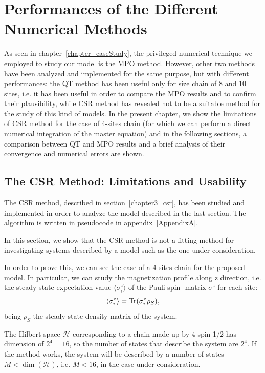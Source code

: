 \chapter{Performances of the Different Numerical Methods}
\label{chapterPerformances}
As seen in chapter~\ref{chapter_caseStudy}, the privileged numerical technique we employed to study our model is the MPO method. However, other two methods have been analyzed and implemented for the same purpose, but with different performances: the QT method has been useful only for size chain of 8 and 10 sites, i.e. it has been useful in order to compare the MPO results and to confirm their plausibility, while CSR method has revealed not to be a suitable method for the study of this kind of models. In the present chapter, we show the limitations of CSR method for the case of 4-sites chain (for which we can perform a direct numerical integration of the master equation) and in the following sections, a comparison between QT and MPO results and a brief analysis of their convergence and numerical errors are shown.

\section{The CSR Method: Limitations and Usability}
The CSR method, described in section~\ref{chapter3_csr}, has been studied and implemented in order to analyze the model described in the last section. The algorithm is written in pseudocode in appendix~\ref{AppendixA}.

In this section, we show that the CSR method is not a fitting method for investigating systems described by a model such as the one under consideration.

In order to prove this, we can see the case of a 4-sites chain for the proposed model. In particular, we can study the magnetization profile along z direction, i.e. the steady-state expectation value $\langle \sigma_i^z \rangle$ of the Pauli spin- matrix $\sigma^z$ for each site:
\begin{equation*}
    \langle \sigma_i^z \rangle = \operatorname{Tr}(\sigma_i^z \rho_S),
\end{equation*}
being $\rho_S$ the steady-state density matrix of the system.

The Hilbert space $\mathcal{H}$ corresponding to a chain made up by 4 spin-1/2 has dimension of $2^{4} = 16$, so the number of states that describe the system are $2^4$. If the method works, the system will be described by a number of states $M < \dim(\mathcal{H})$, i.e. $M < 16$, in the case under consideration.

